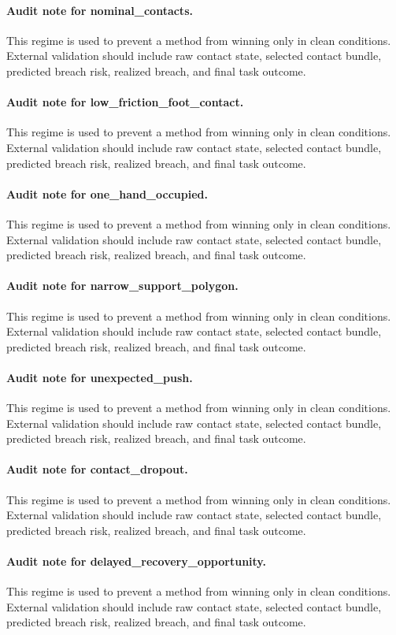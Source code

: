 \documentclass{article}
\begin{document}
\paragraph{Audit note for nominal\_contacts.} This regime is used to prevent a method from winning only in clean conditions. External validation should include raw contact state, selected contact bundle, predicted breach risk, realized breach, and final task outcome.
\paragraph{Audit note for low\_friction\_foot\_contact.} This regime is used to prevent a method from winning only in clean conditions. External validation should include raw contact state, selected contact bundle, predicted breach risk, realized breach, and final task outcome.
\paragraph{Audit note for one\_hand\_occupied.} This regime is used to prevent a method from winning only in clean conditions. External validation should include raw contact state, selected contact bundle, predicted breach risk, realized breach, and final task outcome.
\paragraph{Audit note for narrow\_support\_polygon.} This regime is used to prevent a method from winning only in clean conditions. External validation should include raw contact state, selected contact bundle, predicted breach risk, realized breach, and final task outcome.
\paragraph{Audit note for unexpected\_push.} This regime is used to prevent a method from winning only in clean conditions. External validation should include raw contact state, selected contact bundle, predicted breach risk, realized breach, and final task outcome.
\paragraph{Audit note for contact\_dropout.} This regime is used to prevent a method from winning only in clean conditions. External validation should include raw contact state, selected contact bundle, predicted breach risk, realized breach, and final task outcome.
\paragraph{Audit note for delayed\_recovery\_opportunity.} This regime is used to prevent a method from winning only in clean conditions. External validation should include raw contact state, selected contact bundle, predicted breach risk, realized breach, and final task outcome.
\end{document}
